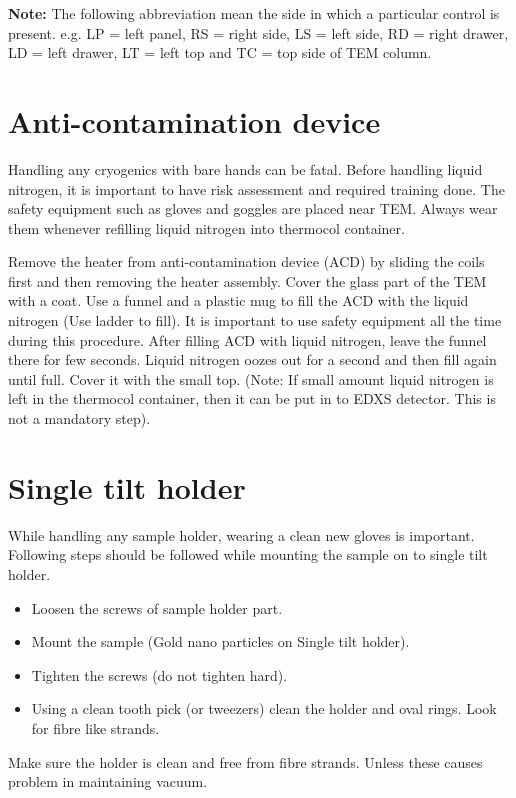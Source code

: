 \documentclass[letterpaper,12pt]{article}
\begin{document}
\footnotemark[1]
\textbf{Note:} The following abbreviation mean the side in which a particular control is present. e.g. LP = left panel, RS = right side, LS = left side, RD = right drawer, LD = left drawer, LT = left top and TC = top side of TEM column.

\section{Anti-contamination device}
Handling any cryogenics with bare hands can be fatal. Before handling liquid nitrogen, it is important to have risk assessment and required training done. The safety equipment such as gloves and goggles are placed near TEM. Always wear them whenever refilling liquid nitrogen into thermocol container.

Remove the heater from anti-contamination device (ACD) by sliding the coils first and then removing the heater assembly. Cover the glass part of the TEM with a coat. Use a funnel and a plastic mug to fill the ACD with the liquid nitrogen (Use ladder to fill). It is important to use safety equipment all the time during this procedure. After filling ACD with liquid nitrogen, leave the funnel there for few seconds. Liquid nitrogen oozes out for a second and then fill again until full. Cover it with the small top. (Note: If small amount liquid nitrogen is left in the thermocol container, then it can be put in to EDXS detector. This is not a mandatory step).

\section{Single tilt holder}
While handling any sample holder, wearing a clean new gloves is important. Following steps should be followed while mounting the sample on to single tilt holder.

\begin{itemize}
\item Loosen the screws of sample holder part.
\item Mount the sample (Gold nano particles on Single tilt holder).
\item Tighten the screws (do not tighten hard).
\item Using a clean tooth pick (or tweezers) clean the holder and oval rings. Look for fibre like strands.
\end{itemize}
Make sure the holder is clean and free from fibre strands. Unless these causes problem in maintaining vacuum.
\end{document}
